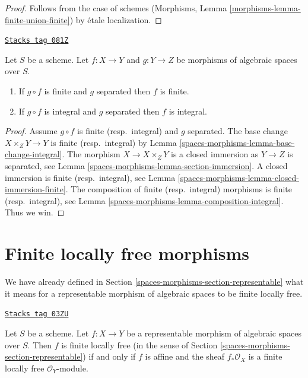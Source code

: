 \begin{proof}
Follows from the case of schemes
(Morphisms, Lemma \ref{morphisms-lemma-finite-union-finite})
by \'etale localization.
\end{proof}

\begin{lemma}
\label{spaces-morphisms-lemma-finite-permanence}
\href{https://stacks.math.columbia.edu/tag/081Z}{\texttt{Stacks tag 081Z}}

Let $S$ be a scheme.
Let $f : X \to Y$ and $g : Y \to Z$ be morphisms of algebraic spaces over $S$.
\begin{enumerate}
\item If $g \circ f$ is finite and $g$ separated then $f$ is finite.
\item If $g \circ f$ is integral and $g$ separated then $f$ is integral.
\end{enumerate}
\end{lemma}

\begin{proof}
Assume $g \circ f$ is finite (resp.\ integral) and $g$ separated.
The base change $X \times_Z Y \to Y$ is finite (resp.\ integral) by
Lemma \ref{spaces-morphisms-lemma-base-change-integral}.
The morphism $X \to X \times_Z Y$ is
a closed immersion as $Y \to Z$ is separated, see
Lemma \ref{spaces-morphisms-lemma-section-immersion}.
A closed immersion is finite (resp.\ integral),
see Lemma \ref{spaces-morphisms-lemma-closed-immersion-finite}.
The composition of finite (resp.\ integral) morphisms is finite
(resp.\ integral),
see Lemma \ref{spaces-morphisms-lemma-composition-integral}. Thus we win.
\end{proof}

\section{Finite locally free morphisms}
\label{spaces-morphisms-section-finite-locally-free}
We have already defined in Section \ref{spaces-morphisms-section-representable}
what it means for a representable morphism of algebraic spaces
to be finite locally free.

\begin{lemma}
\label{spaces-morphisms-lemma-finite-locally-free-representable}
\href{https://stacks.math.columbia.edu/tag/03ZU}{\texttt{Stacks tag 03ZU}}

Let $S$ be a scheme. Let $f : X \to Y$ be a representable morphism
of algebraic spaces over $S$. Then $f$ is finite locally free
(in the sense of Section \ref{spaces-morphisms-section-representable})
if and only if $f$ is affine and the sheaf $f_*\mathcal{O}_X$ is
a finite locally free $\mathcal{O}_Y$-module.
\end{lemma}

